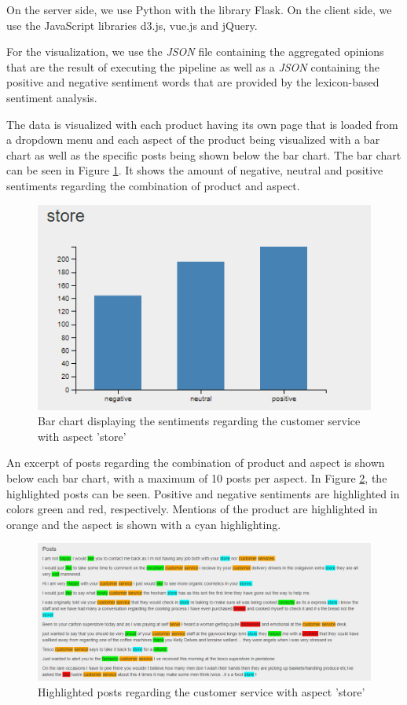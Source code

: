 \documentclass[10pt,a4paper]{article}
\begin{document}
		On the server side, we use Python with the library Flask. On the client side, we use the JavaScript libraries d3.js, vue.js and jQuery.
	
		For the visualization, we use the \textit{JSON} file containing the aggregated opinions that are the result of executing the pipeline as well as a \textit{JSON} containing the positive and negative sentiment words that are provided by the lexicon-based sentiment analysis.
	
		The data is visualized with each product having its own page that is loaded from a dropdown menu and each aspect of the product being visualized with a bar chart as well as the specific posts being shown below the bar chart. The bar chart can be seen in Figure \ref{fig:barchart}. It shows the amount of negative, neutral and positive sentiments regarding the combination of product and aspect.
	
		\begin{figure}[h]
			\centering
			\includegraphics[width=0.7\linewidth]{data/barchart}
			\caption{Bar chart displaying the sentiments regarding the customer service with aspect 'store'}
			\label{fig:barchart}
		\end{figure}
			
		An excerpt of posts regarding the combination of product and aspect is shown below each bar chart, with a maximum of 10 posts per aspect. In Figure \ref{fig:posts}, the highlighted posts can be seen. Positive and negative sentiments are highlighted in colors green and red, respectively. Mentions of the product are highlighted in orange and the aspect is shown with a cyan highlighting.
			
		\begin{figure}[h]
			\centering
			\includegraphics[width=0.9\linewidth]{data/posts}
			\caption{Highlighted posts regarding the customer service with aspect 'store'}
			\label{fig:posts}
		\end{figure}
	
\end{document}
